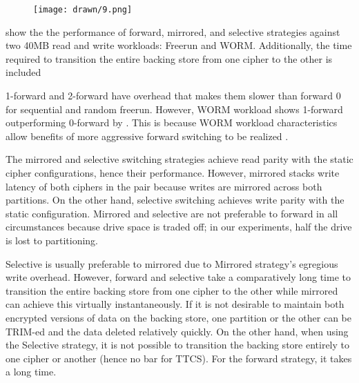 \begin{figure}[ht]
 \centering
  \texttt{[image: drawn/9.png]}
   \caption{}\label{fig:strategy-vs-strategy}
\end{figure}

 show the the performance of forward, mirrored, and
selective strategies against two 40MB read and write workloads: Freerun and
WORM.  Additionally, the time required to
transition the entire backing store from one cipher to the other is included

1-forward and 2-forward have overhead that makes them slower than forward 0 for
sequential and random freerun. However, WORM workload shows 1-forward
outperforming 0-forward by . This is
because WORM workload characteristics allow benefits of more aggressive forward
switching to be realized .

The mirrored and selective switching strategies achieve read parity with the
static cipher configurations, hence their performance. However, mirrored stacks
write latency of both ciphers in the pair because writes are mirrored across
both partitions. On the other hand, selective switching achieves write parity
with the static configuration. Mirrored and selective are not preferable to
forward in all circumstances because drive space is traded off; in our
experiments, half the drive is lost to partitioning.


Selective is usually preferable to mirrored due to Mirrored strategy's egregious
write overhead. However, forward and selective take a comparatively long time to
transition the entire backing store from one cipher to the other while mirrored
can achieve this virtually instantaneously. If it is not desirable to maintain
both encrypted versions of data on the backing store, one partition or the other
can be TRIM-ed and the data deleted relatively quickly. On the other hand, when
using the Selective strategy, it is not possible to transition the backing store
entirely to one cipher or another (hence no bar for TTCS). For the forward
strategy, it takes a long time. 
